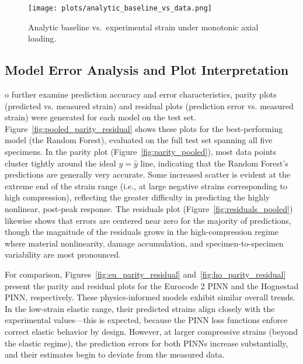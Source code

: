 \documentclass{article}
\begin{document}
\begin{figure}[H]
  \centering
  \texttt{[image: plots/analytic\_baseline\_vs\_data.png]}
  \caption{Analytic baseline vs.\ experimental strain under monotonic axial loading.\protect\footnotemark}
  \label{fig:analytic_baseline_vs_data}
\end{figure}



\subsection{Model Error Analysis and Plot Interpretation}

o further examine prediction accuracy and error characteristics, parity plots (predicted vs. measured strain) and residual plots (prediction error vs. measured strain) were generated for each model on the test set. Figure~\ref{fig:pooled_parity_residual} shows these plots for the best-performing model (the Random Forest), evaluated on the full test set spanning all five specimens. In the parity plot (Figure~\ref{fig:parity_pooled}), most data points cluster tightly around the ideal $y = \hat{y}$ line, indicating that the Random Forest’s predictions are generally very accurate. Some increased scatter is evident at the extreme end of the strain range (i.e., at large negative strains corresponding to high compression), reflecting the greater difficulty in predicting the highly nonlinear, post-peak response. The residuals plot (Figure~\ref{fig:residuals_pooled}) likewise shows that errors are centered near zero for the majority of predictions, though the magnitude of the residuals grows in the high-compression regime where material nonlinearity, damage accumulation, and specimen-to-specimen variability are most pronounced.

For comparison, Figures~\ref{fig:eu_parity_residual} and~\ref{fig:ho_parity_residual} present the parity and residual plots for the Eurocode 2 PINN and the Hognestad PINN, respectively. These physics-informed models exhibit similar overall trends. In the low-strain elastic range, their predicted strains align closely with the experimental values—this is expected, because the PINN loss functions enforce correct elastic behavior by design. However, at larger compressive strains (beyond the elastic regime), the prediction errors for both PINNs increase substantially, and their estimates begin to deviate from the measured data.
\end{document}
